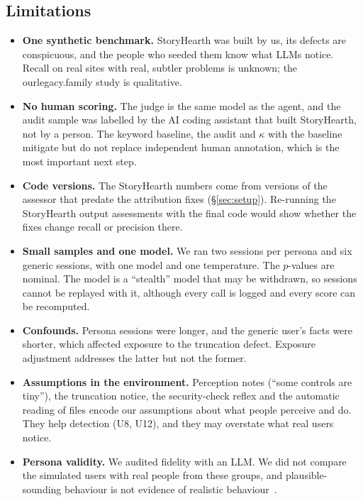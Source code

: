 \documentclass[10pt,twocolumn]{article}
\newcommand{\site}{StoryHearth}
\newcommand{\ol}{\textsf{ourlegacy.family}}
\begin{document}
\subsection{Limitations}
\label{sec:limitations}

\begin{itemize}
\item \textbf{One synthetic benchmark.} \site{} was built by us, its defects are conspicuous, and the people who seeded them know what LLMs notice. Recall on real sites with real, subtler problems is unknown; the \ol{} study is qualitative.
\item \textbf{No human scoring.} The judge is the same model as the agent, and the audit sample was labelled by the AI coding assistant that built \site{}, not by a person. The keyword baseline, the audit and $\kappa$ with the baseline mitigate but do not replace independent human annotation, which is the most important next step.
\item \textbf{Code versions.} The \site{} numbers come from versions of the assessor that predate the attribution fixes (\S\ref{sec:setup}). Re-running the \site{} output assessments with the final code would show whether the fixes change recall or precision there.
\item \textbf{Small samples and one model.} We ran two sessions per persona and six generic sessions, with one model and one temperature. The $p$-values are nominal. The model is a ``stealth'' model that may be withdrawn, so sessions cannot be replayed with it, although every call is logged and every score can be recomputed.
\item \textbf{Confounds.} Persona sessions were longer, and the generic user's facts were shorter, which affected exposure to the truncation defect. Exposure adjustment addresses the latter but not the former.
\item \textbf{Assumptions in the environment.} Perception notes (``some controls are tiny''), the truncation notice, the security-check reflex and the automatic reading of files encode our assumptions about what people perceive and do. They help detection (U8, U12), and they may overstate what real users notice.
\item \textbf{Persona validity.} We audited fidelity with an LLM. We did not compare the simulated users with real people from these groups, and plausible-sounding behaviour is not evidence of realistic behaviour~\cite{wang2025large,agnew2024illusion}.
\end{itemize}
\end{document}
